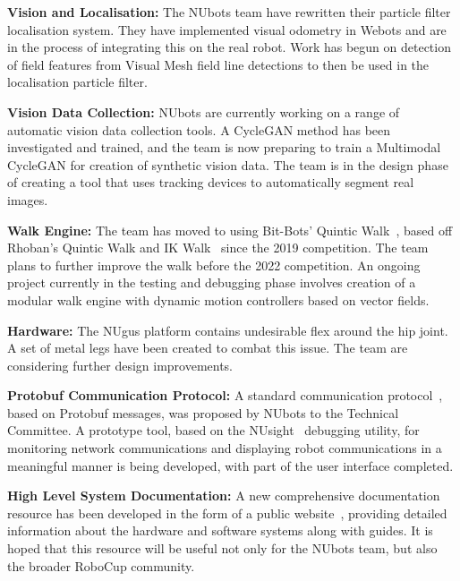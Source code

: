\documentclass{llncs}
\begin{document}
\noindent\textbf{Vision and Localisation:}
The NUbots team have rewritten their particle filter localisation system. They have implemented visual odometry in Webots and are in the process of integrating this on the real robot. Work has begun on detection of field features from Visual Mesh \cite{Houliston2018VisualMR} field line detections to then be used in the localisation particle filter. \newline

\noindent\textbf{Vision Data Collection:}
NUbots are currently working on a range of automatic vision data collection tools. A CycleGAN method has been investigated and trained, and the team is now preparing to train a Multimodal CycleGAN for creation of synthetic vision data. The team is in the design phase of creating a tool that uses tracking devices to automatically segment real images.\newline 

\noindent\textbf{Walk Engine:}
The team has moved to using Bit-Bots' Quintic Walk~\cite{bitbotsMotionGit}, based off Rhoban's Quintic Walk and IK Walk~\cite{rhobanModelGit} since the 2019 competition. The team plans to further improve the walk before the 2022 competition.
An ongoing project currently in the testing and debugging phase involves creation of a modular walk engine with dynamic motion controllers based on vector fields. \newline

\noindent\textbf{Hardware:}
The NUgus platform contains undesirable flex around the hip joint. A set of metal legs have been created to combat this issue. The team are considering further design improvements. \newline

\noindent\textbf{Protobuf Communication Protocol:}
A standard communication protocol~\cite{nubotsProtocolGit}, based on Protobuf messages, was proposed by NUbots to the Technical Committee. A prototype tool, based on the NUsight~\cite{nubotsNUsightGit} debugging utility, for monitoring network communications and displaying robot communications in a meaningful manner is being developed, with part of the user interface completed.\newline

\noindent\textbf{High Level System Documentation:} 
A new comprehensive documentation resource has been developed in the form of a public website~\cite{nubotsNUbookGit}, providing detailed information about the hardware and software systems along with guides. It is hoped that this resource will be useful not only for the NUbots team, but also the broader RoboCup community. \newline



\end{document}

